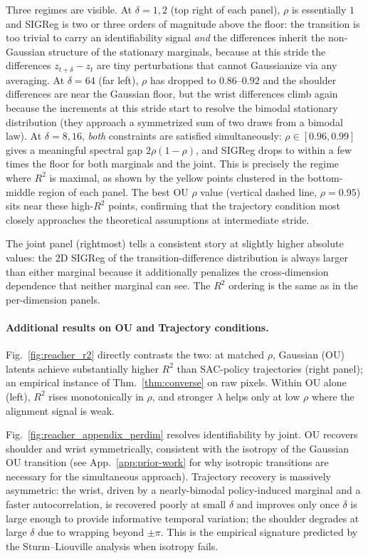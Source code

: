 Three regimes are visible.
At $\delta = 1, 2$ (top right of each panel), $\rho$ is essentially $1$ and SIGReg is two or three orders of magnitude above the floor: the transition is too trivial to carry an identifiability signal \emph{and} the differences inherit the non-Gaussian structure of the stationary marginals, because at this stride the differences $z_{t+\delta} - z_t$ are tiny perturbations that cannot Gaussianize via any averaging.
At $\delta = 64$ (far left), $\rho$ has dropped to $0.86$--$0.92$ and the shoulder differences are near the Gaussian floor, but the wrist differences climb again because the increments at this stride start to resolve the bimodal stationary distribution (they approach a symmetrized sum of two draws from a bimodal law).
At $\delta = 8, 16$, \emph{both} constraints are satisfied simultaneously: $\rho \in [0.96, 0.99]$ gives a meaningful spectral gap $2\rho(1-\rho)$, and SIGReg drops to within a few times the floor for both marginals and the joint.
This is precisely the regime where $R^2$ is maximal, as shown by the yellow points clustered in the bottom-middle region of each panel.
The best OU $\rho$ value (vertical dashed line, $\rho = 0.95$) sits near these high-$R^2$ points, confirming that the trajectory condition most closely approaches the theoretical assumptions at intermediate stride.

The joint panel (rightmost) tells a consistent story at slightly higher absolute values: the 2D SIGReg of the transition-difference distribution is always larger than either marginal because it additionally penalizes the cross-dimension dependence that neither marginal can see.
The $R^2$ ordering is the same as in the per-dimension panels.


\paragraph{Additional results on OU and Trajectory conditions.}
Fig.~\ref{fig:reacher_r2} directly contrasts the two: at matched $\rho$, Gaussian (OU) latents achieve substantially higher $R^2$ than SAC-policy trajectories (right panel); an empirical instance of Thm.~\ref{thm:converse} on raw pixels. Within OU alone (left), $R^2$ rises monotonically in $\rho$, and stronger $\lambda$ helps only at low $\rho$ where the alignment signal is weak.

Fig.~\ref{fig:reacher_appendix_perdim} resolves identifiability by joint. OU recovers shoulder and wrist symmetrically, consistent with the isotropy of the Gaussian OU transition (see App.~\ref{app:prior-work} for why isotropic transitions are necessary for the simultaneous approach). Trajectory recovery is massively asymmetric: the wrist, driven by a nearly-bimodal policy-induced marginal and a faster autocorrelation, is recovered poorly at small $\delta$ and improves only once $\delta$ is large enough to provide informative temporal variation; the shoulder degrades at large $\delta$ due to wrapping beyond $\pm\pi$. This is the empirical signature predicted by the Sturm--Liouville analysis when isotropy fails.

